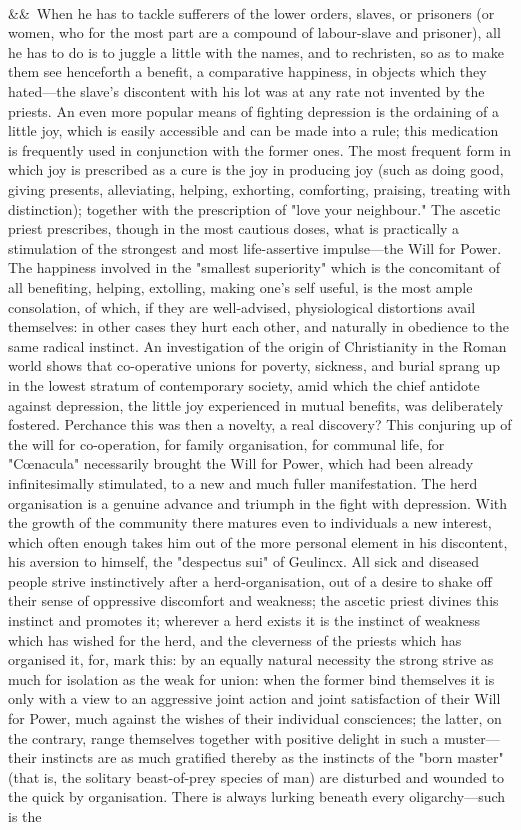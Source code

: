 \documentclass[12pt]{article}
\newcommand{\para}[1][]{\par\noindent\ifx&#1&\else\textsuperscript{\footnotesize #1}~\fi}
\begin{document}
\para When he has to tackle sufferers of the lower orders, slaves, or prisoners (or women, who for the most part are a compound of labour-slave and prisoner), all he has to do is to juggle a little with the names, and to rechristen, so as to make them see henceforth a benefit, a comparative happiness, in objects which they hated---the slave's discontent with his lot was at any rate not invented by the priests. An even more popular means of fighting depression is the ordaining of a little joy, which is easily accessible and can be made into a rule; this medication is frequently used in conjunction with the former ones. The most frequent form in which joy is prescribed as a cure is the joy in producing joy (such as doing good, giving presents, alleviating, helping, exhorting, comforting, praising, treating with distinction); together with the prescription of "love your neighbour." The ascetic priest prescribes, though in the most cautious doses, what is practically a stimulation of the strongest and most life-assertive impulse---the Will for Power. The happiness involved in the "smallest superiority" which is the concomitant of all benefiting, helping, extolling, making one's self useful, is the most ample consolation, of which, if they are well-advised, physiological distortions avail themselves: in other cases they hurt each other, and naturally in obedience to the same radical instinct. An investigation of the origin of Christianity in the Roman world shows that co-operative unions for poverty, sickness, and burial sprang up in the lowest stratum of contemporary society, amid which the chief antidote against depression, the little joy experienced in mutual benefits, was deliberately fostered. Perchance this was then a novelty, a real discovery? This conjuring up of the will for co-operation, for family organisation, for communal life, for "Cœnacula" necessarily brought the Will for Power, which had been already infinitesimally stimulated, to a new and much fuller manifestation. The herd organisation is a genuine advance and triumph in the fight with depression. With the growth of the community there matures even to individuals a new interest, which often enough takes him out of the more personal element in his discontent, his aversion to himself, the "despectus sui" of Geulincx. All sick and diseased people strive instinctively after a herd-organisation, out of a desire to shake off their sense of oppressive discomfort and weakness; the ascetic priest divines this instinct and promotes it; wherever a herd exists it is the instinct of weakness which has wished for the herd, and the cleverness of the priests which has organised it, for, mark this: by an equally natural necessity the strong strive as much for isolation as the weak for union: when the former bind themselves it is only with a view to an aggressive joint action and joint satisfaction of their Will for Power, much against the wishes of their individual consciences; the latter, on the contrary, range themselves together with positive delight in such a muster---their instincts are as much gratified thereby as the instincts of the "born master" (that is, the solitary beast-of-prey species of man) are disturbed and wounded to the quick by organisation. There is always lurking beneath every oligarchy---such is the 
\end{document}
